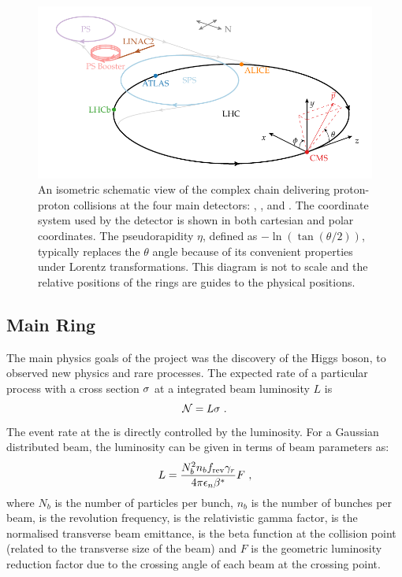 \begin{figure}[htb]
    \centering
    \includegraphics{diagrams/tikz/lhc_complex/lhc_complex.pdf}
    \caption[Schematic view of the LHC complex.]{
        An isometric schematic view of the \LHC complex chain delivering
        proton-proton collisions at the four main detectors: \LHCb, \ATLAS,
        \ALICE and \CMS. The coordinate system used by the \CMS detector is
        shown in both cartesian and polar coordinates. The pseudorapidity
        $\eta$, defined as $-\ln(\tan(\theta/2))$, typically replaces the
        $\theta$ angle because of its convenient properties under Lorentz
        transformations. This diagram is not to scale and the relative
        positions of the rings are guides to the physical positions.
    }
    \label{fig:LHC-Complex}
\end{figure}


\subsection{\LHC Main Ring}

The main physics goals of the \LHC project was the discovery of the Higgs
boson, to observed new physics and rare \SM processes. The expected rate of a
particular process with a cross section $\sigma$ at a integrated beam luminosity
$L$ is
%
\begin{equation}
    \mathcal{N} = L \sigma \ .
\end{equation}
%
The event rate at the \LHC is directly controlled by the luminosity. For a
Gaussian distributed beam, the luminosity can be given in terms of beam
parameters as:
%
\begin{equation}
    \label{eq:beam-lumi}
    L = \frac{N_b^2 n_bf_{\mathrm{rev}}\gamma_{r}}{4\pi\epsilon_n\beta^*} F\ ,
\end{equation}
%
where $N_b$ is the number of particles per bunch, $n_b$ is the number of
bunches per beam, \frev is the revolution frequency, \relgamma is the
relativistic gamma factor, \emitt is the normalised transverse beam emittance,
\bstar is the beta function at the collision point (related to the transverse
size of the beam) and $F$ is the geometric luminosity reduction factor due to
the crossing angle of each beam at the crossing point.

